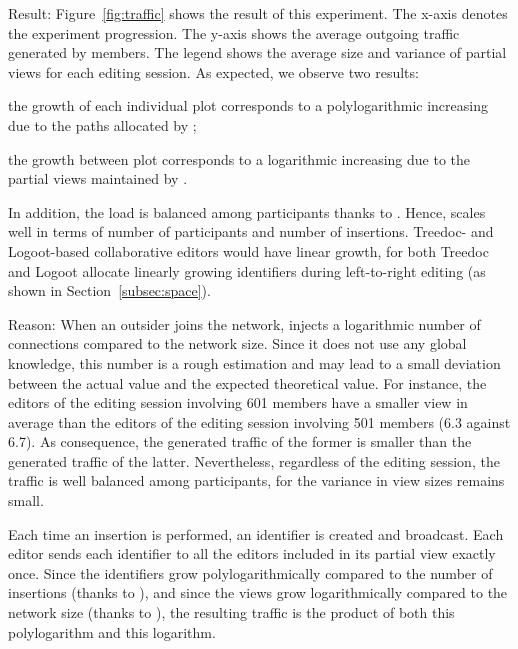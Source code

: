 \begin{asparadesc}
\item [Result:] Figure~\ref{fig:traffic} shows the result of this experiment.
  The x-axis denotes the experiment progression. The y-axis shows the average
  outgoing traffic generated by members. The legend shows the average size and
  variance of partial views for each editing session.  As expected, we observe
  two results:
  \begin{inparaenum}[(i)]
  \item the growth of each individual plot corresponds to a polylogarithmic
    increasing due to the paths allocated by \LSEQ;
  \item the growth between plot corresponds to a logarithmic increasing due to
    the partial views maintained by \SPRAY.
  \end{inparaenum}
  In addition, the load is balanced among participants thanks to \SPRAY.  Hence,
  \CRATE scales well in terms of number of participants and number of
  insertions. Treedoc- and Logoot-based collaborative editors would have linear
  growth, for both Treedoc and Logoot allocate linearly growing identifiers
  during left-to-right editing (as shown in Section~\ref{subsec:space}).
\item [Reason:] When an outsider joins the network, \SPRAY injects a logarithmic
  number of connections compared to the network size. Since it does not use any
  global knowledge, this number is a rough estimation and may lead to a small
  deviation between the actual value and the expected theoretical value. For
  instance, the editors of the editing session involving 601 members have a
  smaller view in average than the editors of the editing session involving 501
  members (6.3 against 6.7). As consequence, the generated traffic of the former
  is smaller than the generated traffic of the latter. Nevertheless, regardless
  of the editing session, the traffic is well balanced among participants, for
  the variance in view sizes remains small.

  Each time an insertion is performed, an identifier is created and broadcast.
  Each editor sends each identifier to all the editors included in its partial
  view exactly once. Since the identifiers grow polylogarithmically compared to
  the number of insertions (thanks to \LSEQ), and since the views grow
  logarithmically compared to the network size (thanks to \SPRAY), the resulting
  traffic is the product of both this polylogarithm and this logarithm.
\end{asparadesc}

